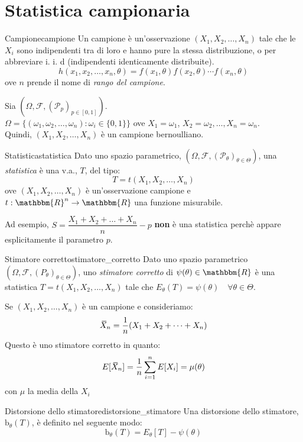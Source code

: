 \documentclass[12pt]{report}
\newcounter{definition}
\newcommand{\nmu}{}
\newcommand{\wbar}[1]{%
	\accentset{\mbox{\rule{0.55em}{0.5pt}}}{#1}%
}
\begin{document}
	\section{Statistica campionaria}
	\begin{definition}{\nmu Campione}{campione}
		Un campione è un'osservazione $(X_1, X_2, \dots, X_n)$ tale che le $X_i$ sono indipendenti tra di loro e hanno pure la stessa distribuzione, o per abbreviare i. i. d (indipendenti identicamente distribuite).
		\[
		h(x_1, x_2, \dots, x_n, \theta) = f(x_1,\theta)f(x_2,\theta)\cdots f(x_n,\theta)
		\]
		ove $n$ prende il nome di \textit{rango del campione}.
	\end{definition}
	\begin{example}{}{}
		Sia $(\Omega, \mathcal{F}, (\mathcal{P}_p)_{p \in [0, 1]})$. \\
		$\Omega = \{(\omega_1, \omega_2, \dots, \omega_n) : \omega_i \in \{0, 1\}\}$ ove $X_1 = \omega_1$, $X_2 = \omega_2, \dots, X_n = \omega_n$. \\
		Quindi, $(X_1, X_2, \dots, X_n)$ è un campione bernoulliano.
	\end{example}
	\begin{definition}{\nmu Statistica}{statistica}
		Dato uno spazio parametrico, $(\Omega, \mathcal{F}, (\mathcal{P}_\theta)_{\theta\in\Theta})$, una \textit{statistica} è una v.a., $T$, del tipo:
		\[
		T = t(X_1, X_2, \dots, X_n)
		\]
		ove $(X_1, X_2, \dots, X_n)$ è un'osservazione campione e $t: \mathbbm{R}^n \to \mathbbm{R}$ una funzione misurabile.
	\end{definition}
	Ad esempio, $S = \dfrac{X_1 + X_2 + \dots + X_n}{n} - p$ \textbf{non} è una statistica perchè appare esplicitamente il parametro $p$.
	\begin{definition}{\nmu Stimatore corretto}{stimatore_corretto}
		Dato uno spazio parametrico $(\Omega, \mathcal{F}, (P_\theta)_{\theta \in \Theta})$, uno \textit{stimatore corretto} di $\psi(\theta) \in \mathbbm{R}$ è una statistica  $T = t(X_1, X_2, \dots, X_n)$ tale che $E_\theta(T) = \psi(\theta) \quad \forall \theta \in \Theta$.
	\end{definition}
	\begin{example}{}{}
		Se $(X_1, X_2, \dots, X_n)$ è un campione e consideriamo:
		\[
		\wbar{X}_n =  \dfrac{1}{n}(X_1 + X_2 + \dots + X_n)
		\]
		Questo è uno stimatore corretto in quanto:
		\[
		E[\wbar{X}_n] = \dfrac{1}{n}\sum_{i=1}^{n}E[X_i] = \mu(\theta)
		\]
		con $\mu$ la media della $X_i$
	\end{example}
	\begin{definition}{\nmu Distorsione dello stimatore}{distorsione_stimatore}
		Una distorsione dello stimatore, $\text{b}_\theta(T)$, è definito nel seguente modo:
		\[
		\text{b}_\theta(T) = E_\theta[T] - \psi(\theta)
		\]
	\end{definition}
\end{document}
